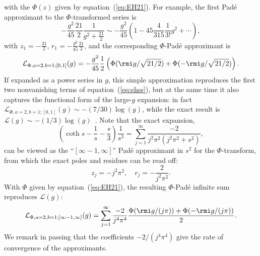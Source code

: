 \documentclass[12pt]{iopart}
\begin{document}
%
with the $\Phi(z)$ given by equation~(\ref{eq:EH21}). For example, the first Pad\'e approximant to the $\Phi$-transformed series is
%
\begin{equation}
	-\frac{g^2}{45} \frac{21}{2} \frac{1}{g^2+\frac{21}{2} } 
	 \sim
	-\frac{g^2}{45}
	\left(
	1 - 45\frac{ 4}{315}\frac{1}{3!}g^2 +\cdots
	\right) ,
\end{equation}
%
with $z_1=-\frac{21}{2}$,  $r_1=-\frac{g^2}{45}\frac{21}{2}$, and the corresponding $\Phi$-Pad\'e approximant is
%
\begin{equation}
 \mathcal{L}_{ \Phi,a=2,b=1;[0,1]} (g) = 
	-\frac{g^2}{45}
	 \frac{1}{2}
   \left( 
   \Phi ( \rmi g/\sqrt{21/2} ) +  \Phi ( -\rmi g/\sqrt{21/2} )
  \right).
\end{equation}
%
%
If expanded as a power series in $g$, this simple approximation reproduces
the first two nonvanishing terms of equation~(\ref{eq:ehss}), but at the same time it also captures
the functional form of the large-$g$ expansion: in fact $\mathcal{L}_{ \Phi,a=2,b=1;[0,1]} (g) \sim  -(7/30)\log(g)$,
while the exact result is $\mathcal{L}(g)\sim  -(1/3)\log(g)$~\cite{DU04}. Note that
the exact expansion,
%
\begin{equation}
	\left(\coth s - \frac{1}{s} - \frac{s}{3}\right)\frac{1}{s^3}
	=
	 \sum_{j=1}^\infty \frac{-2}{ j^2 \pi^2 ( j^2 \pi^2 +s^2)} ,
\end{equation}
%
can be viewed as the  ``$[\infty-1,\infty]$'' Pad\'e approximant in $s^2$ for the $\Phi$-transform,
from which the exact poles and residues can be read off:
%
\begin{equation}
	z_j = - j^2 \pi^2,
\quad
	r_j  = -\frac{2}{ j^2 \pi^2 }.
\end{equation}
%
With $\Phi$ given by equation~(\ref{eq:EH21}), the resulting $\Phi$-Pad\'e infinite sum reproduces $\mathcal{L}(g)$:
%
\begin{equation}
	\mathcal{L}_{ \Phi,a=2,b=1;[\infty-1,\infty]} (g) = 
	\sum_{j=1}^\infty
	\frac{ - 2 }{ j^4 \pi^4 }
	\frac{ 
	\Phi( \rmi g / ( j \pi )) +  \Phi( - \rmi g / ( j \pi ))}
	{2}.
\end{equation}
%
We remark in passing that the coefficients $-2/(j^{4}\pi^{4})$ give the rate of convergence of the approximants.
\end{document}
